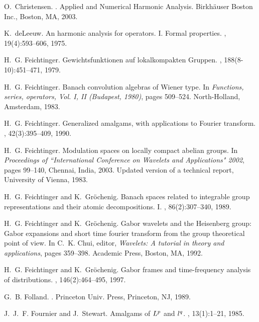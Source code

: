 \documentclass[12pt]{amsart}
\theoremstyle{definition}
\theoremstyle{remark}
\numberwithin{equation}{section}
\begin{document}
\begin{thebibliography}{10}
O.~Christensen.
.
\newblock Applied and Numerical Harmonic Analysis. Birkh\"auser Boston Inc.,
  Boston, MA, 2003.

K.~deLeeuw.
\newblock An harmonic analysis for operators. {I}. {F}ormal properties.
, 19(4):593--606, 1975.

H.~G. Feichtinger.
\newblock Gewichtsfunktionen auf lokalkompakten {G}ruppen.
,
  188(8-10):451--471, 1979.

H.~G. Feichtinger.
\newblock Banach convolution algebras of {W}iener type.
\newblock In {\em Functions, series, operators, Vol. I, II (Budapest, 1980)},
  pages 509--524. North-Holland, Amsterdam, 1983.

H.~G. Feichtinger.
\newblock Generalized amalgams, with applications to {F}ourier transform.
, 42(3):395--409, 1990.

H.~G. Feichtinger.
\newblock Modulation spaces on locally compact abelian groups.
\newblock In {\em Proceedings of ``International Conference on Wavelets and
  Applications" 2002}, pages 99--140, Chennai, India, 2003.
\newblock Updated version of a technical report, University of Vienna, 1983.

H.~G. Feichtinger and K.~Gr{\"o}chenig.
\newblock Banach spaces related to integrable group representations and their
  atomic decompositions. {I}.
, 86(2):307--340, 1989.

H.~G. Feichtinger and K.~Gr{\"o}chenig.
\newblock Gabor wavelets and the {H}eisenberg group: {G}abor expansions and
  short time fourier transform from the group theoretical point of view.
\newblock In C.~K. Chui, editor, {\em Wavelets: A tutorial in theory and
  applications}, pages 359--398. Academic Press, Boston, MA, 1992.

H.~G. Feichtinger and K.~Gr{\"o}chenig.
\newblock Gabor frames and time-frequency analysis of distributions.
, 146(2):464--495, 1997.

G.~B. Folland.
.
\newblock Princeton Univ. Press, Princeton, NJ, 1989.

J.~J.~F. Fournier and J.~Stewart.
\newblock Amalgams of ${L}\sp p$ and $l\sp q$.
, 13(1):1--21, 1985.


\end{thebibliography}
\end{document}
